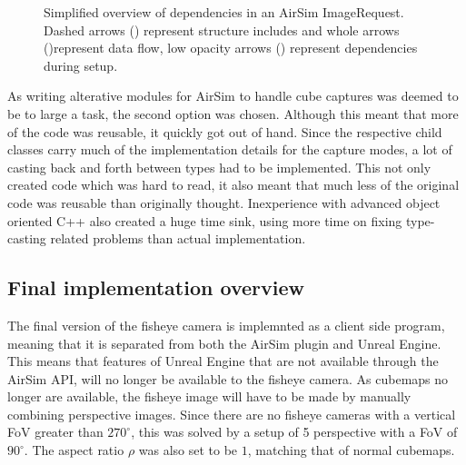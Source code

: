 \begin{figure}[!htb]
    \caption{Simplified overview of dependencies in an AirSim ImageRequest. Dashed arrows (\protect\drawdashedarrow) represent structure includes and whole arrows (\protect\drawarrow)represent data flow, low opacity arrows (\protect\drawopacitydarrow) represent dependencies during setup.}
    \label{fig:comm_pattern_camera_request}
\end{figure}

As writing alterative modules for AirSim to handle cube captures was deemed to be to large a task, the second option was chosen. Although this meant that more of the code was reusable, it quickly got out of hand. Since the respective child classes carry much of the implementation details for the capture modes, a lot of casting back and forth between types had to be implemented. This not only created code which was hard to read, it also meant that much less of the original code was reusable than originally thought. Inexperience with advanced object oriented C++ also created a huge time sink, using more time on fixing type-casting related problems than actual implementation.

\subsection{Final implementation overview} \label{subsec:Fisheye_impl_overview}

The final version of the fisheye camera is implemnted as a client side program, meaning that it is separated from both the AirSim plugin and Unreal Engine. This means that features of Unreal Engine that are not available through the AirSim API, will no longer be available to the fisheye camera. As cubemaps no longer are available, the fisheye image will have to be made by manually combining perspective images. Since there are no fisheye cameras with a vertical FoV greater than $270^\circ$, this was solved by a setup of 5 perspective with a FoV of $90^\circ$. The aspect ratio $\rho$ was also set to be $1$, matching that of normal cubemaps. 

